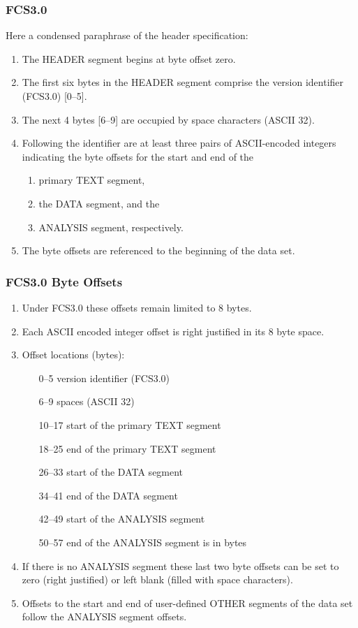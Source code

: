 \documentclass{beamer}
\begin{document}
\begin{frame}[fragile]
  \frametitle{FCS3.0}
  Here a condensed paraphrase of the header specification:
  \begin{enumerate}
  \item The HEADER segment begins at byte offset zero. 
  \item The first six bytes in the HEADER segment comprise the version identifier (FCS3.0) [0--5].
  \item The next 4 bytes [6--9] are occupied by space characters (ASCII 32). 
  \item Following the identifier are at least three pairs of ASCII-encoded integers indicating the byte offsets for the start and end of the
    \begin{enumerate}
    \item primary TEXT segment, 
    \item the DATA segment, and the 
    \item ANALYSIS segment, respectively.
    \end{enumerate}
  \item The byte offsets are referenced to the beginning of the data set.
  \end{enumerate}
\end{frame}
\begin{frame}
  \frametitle{FCS3.0 Byte Offsets}
  \begin{enumerate}
  \item Under FCS3.0 these offsets remain limited to 8 bytes. 
  \item Each ASCII encoded integer offset is right justified in its 8 byte space. 
  \item Offset locations (bytes):
    \begin{enumerate}
    \item [0--5] version identifier (FCS3.0)
    \item [6--9] spaces (ASCII 32)
    \item [10--17] start of the primary TEXT segment
    \item [18--25] end of the primary TEXT segment
    \item [26--33] start of the DATA segment
    \item [34--41] end of the DATA segment
    \item [42--49] start of the ANALYSIS segment
    \item [50--57] end of the ANALYSIS segment is in bytes
    \end{enumerate}
  \item If there is no ANALYSIS segment these last two byte offsets
    can be set to zero (right justified) or left blank (filled with
    space characters).
  \item Offsets to the start and end of user-defined OTHER segments of
    the data set follow the ANALYSIS segment offsets.
  \end{enumerate}
\end{frame}
\end{document}

